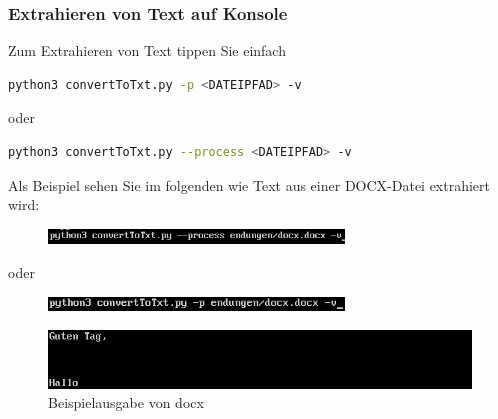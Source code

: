 \documentclass[12pt]{scrartcl}
\begin{document}
\subsubsection{Extrahieren von Text auf Konsole}
\label{sec:first-steps-extraction-console}
Zum Extrahieren von Text tippen Sie einfach	

\begin{lstlisting}[language=bash]
python3 convertToTxt.py -p <DATEIPFAD> -v 
\end{lstlisting}\begin{center}
oder 
\end{center}
\begin{lstlisting}[language=bash]
python3 convertToTxt.py --process <DATEIPFAD> -v
\end{lstlisting}
Als Beispiel sehen Sie im folgenden wie Text aus einer DOCX-Datei extrahiert wird:
\begin{figure}[htbp]
\centering
\includegraphics[width=0.7\textwidth]{ersteSchritteExtract001}\par\vspace{0.25cm}
\label{fig:ersteSchritteExtract001}
\end{figure}
\begin{center}
oder
\end{center}
\begin{figure}[htbp]
\centering
\includegraphics[width=0.7\textwidth]{ersteSchritteExtract002}\par\vspace{0.25cm}
\label{fig:ersteSchritteExtract002}
\end{figure}
\begin{figure}[htbp]
\includegraphics[width=1.0\textwidth]{ersteSchritteExtract003}\par\vspace{0.25cm}
\caption{Beispielausgabe von docx}
\label{fig:ersteSchritteExtract003}
\end{figure}
\newpage
\end{document}
